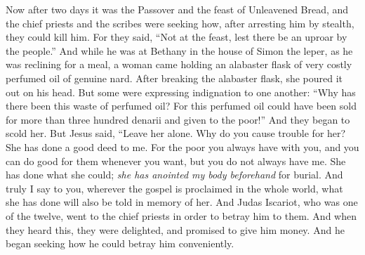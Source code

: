 \begin{biblechapter} %
 Now after two days it was the Passover and the feast of Unleavened Bread, and the chief priests and the scribes were seeking how, after arresting him by stealth, they could kill him.
\verse For they said, “Not at the feast, lest there be an uproar by the people.”
 And while he was at Bethany in the house of Simon the leper, as he was reclining for a meal, a woman came holding an alabaster flask of very costly perfumed oil of genuine nard. After breaking the alabaster flask, she poured it out on his head.
\verse But some were expressing indignation to one another: “Why has there been this waste of perfumed oil?
\verse For this perfumed oil could have been sold for more than three hundred denarii and given to the poor!” And they began to scold her.
\verse But Jesus said, “Leave her alone. Why do you cause trouble for her? She has done a good deed to me.
\verse For the poor you always have with you, and you can do good for them whenever you want, but you do not always have me.
\verse She has done what she could; \textit{she has anointed my body beforehand} for burial.
\verse And truly I say to you, wherever the gospel is proclaimed in the whole world, what she has done will also be told in memory of her.
 And Judas Iscariot, who was one of the twelve, went to the chief priests in order to betray him to them.
\verse And when they heard this, they were delighted, and promised to give him money. And he began seeking how he could betray him conveniently.

\end{biblechapter}
